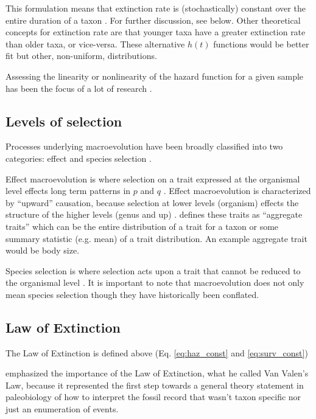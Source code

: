 \documentclass[12pt,letterpaper]{article}
\begin{document}
This formulation means that extinction rate is (stochastically) constant over the entire duration of a taxon \citep{VanValen1973}. For further discussion, see below. Other theoretical concepts for extinction rate are that younger taxa have a greater extinction rate than older taxa, or vice-versa. These alternative \(h(t)\) functions would be better fit but other, non-uniform, distributions.

Assessing the linearity or nonlinearity of the hazard function for a given sample has been the focus of a lot of research \citep{Raup1975,Raup1978,Kitchell1991}.

\subsection{Levels of selection}
Processes underlying macroevolution have been broadly classified into two categories: effect and species selection \citep{Jablonski2008a}.

Effect macroevolution is where selection on a trait expressed at the organismal level effects long term patterns in \(p\) and \(q\) \citep{Vrba1983,Jablonski2008a}. Effect macroevolution is characterized by ``upward'' causation, because selection at lower levels (organism) effects the structure of the higher levels (genus and up) \citep{Jablonski2008a}. \citet{Jablonski2008a} defines these traits as ``aggregate traits'' which can be the entire distribution of a trait for a taxon or some summary statistic (e.g. mean) of a trait distribution. An example aggregate trait would be body size. %

Species selection is where selection acts upon a trait that cannot be reduced to the organismal level \citep{Jablonski2007,Jablonski2008a}.
It is important to note that macroevolution does not only mean species selection \citep{Vrba1983} though they have historically been conflated.

\subsection{Law of Extinction}
The Law of Extinction is defined above (Eq. \ref{eq:haz_const} and \ref{eq:surv_const})

\citet{Raup1975} emphasized the importance of the Law of Extinction, what he called Van Valen's Law, because it represented the first step towards a general theory statement in paleobiology of how to interpret the fossil record that wasn't taxon specific nor just an enumeration of events.
\end{document}
